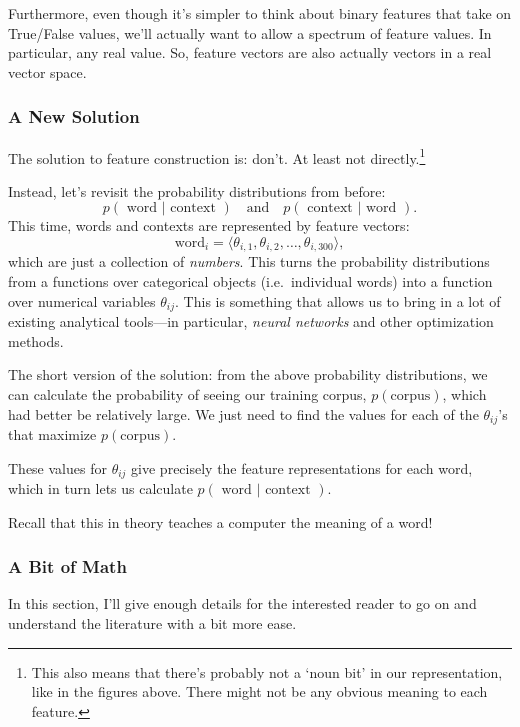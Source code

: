 \documentclass[11pt]{article}
\begin{document}
Furthermore, even though it's simpler to think about binary features
that take on True/False values, we'll actually want to allow a spectrum
of feature values. In particular, any real value. So, feature vectors
are also actually vectors in a real vector space.

\subsubsection{A New Solution}\label{a-new-solution}

The solution to feature construction is: don't. At least not
directly.\footnote{This also means that there's probably not a `noun
  bit' in our representation, like in the figures above. There might not
  be any obvious meaning to each feature.}

Instead, let's revisit the probability distributions from before:
\[p(\textrm{ word }|\textrm{ context }) \quad\textrm{and}\quad p(\textrm{ context }|\textrm{ word }).\]
This time, words and contexts are represented by feature vectors:
\[\textrm{word}_i = \langle \theta_{i,1}, \theta_{i,2}, \dotsc, \theta_{i,300}\rangle,\]
which are just a collection of \emph{numbers}. This turns the
probability distributions from a functions over categorical objects
(i.e.~individual words) into a function over numerical variables
\(\theta_{ij}\). This is something that allows us to bring in a lot of
existing analytical tools---in particular, \emph{neural networks} and
other optimization methods.

The short version of the solution: from the above probability
distributions, we can calculate the probability of seeing our training
corpus, \(p(\textrm{corpus})\), which had better be relatively large. We
just need to find the values for each of the \(\theta_{ij}\)'s that
maximize \(p(\textrm{corpus})\).

These values for \(\theta_{ij}\) give precisely the feature
representations for each word, which in turn lets us calculate
\(p( \textrm{ word }|\textrm{ context })\).

Recall that this in theory teaches a computer the meaning of a word!

\subsubsection*{A Bit of Math}\label{a-bit-of-math}

In this section, I'll give enough details for the interested reader to
go on and understand the literature with a bit more ease.
\end{document}
